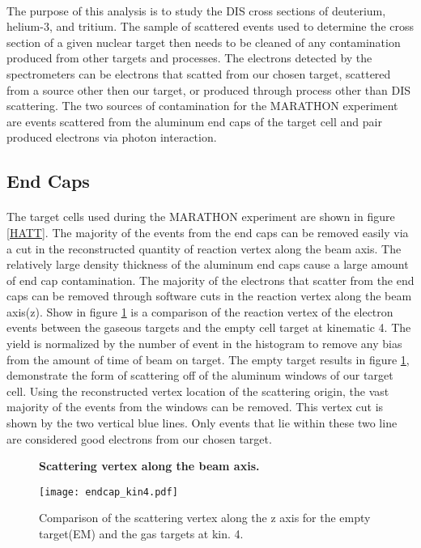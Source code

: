\paragraph{} The purpose of this analysis is to study the DIS cross sections of deuterium, helium-3, and tritium. The sample of scattered events used to determine the cross section of a given nuclear target then needs to be cleaned of any contamination produced from other targets and processes. The electrons detected by the spectrometers can be electrons that scatted from our chosen target, scattered from a source other then our target, or produced through process other than DIS scattering. The two sources of contamination for the MARATHON experiment are events scattered from the aluminum end caps of the target cell and pair produced electrons via photon interaction. 
\subsection{End Caps}
\paragraph{} The target cells used during the MARATHON experiment are shown in figure \ref{HATT}. The majority of the events from the end caps can be removed easily via a cut in the reconstructed quantity of reaction vertex along the beam axis. The relatively large density thickness of the aluminum end caps cause a large amount of end cap contamination. The majority of the electrons that scatter from the end caps can be removed through software cuts in the reaction vertex along the beam axis(z). Show in figure \ref{EC5} is a comparison of the reaction vertex of the electron events between the gaseous targets and the empty cell target at kinematic 4. The yield is normalized by the number of event in the histogram to remove any bias from the amount of time of beam on target. The empty target  results in figure \ref{EC5}, demonstrate the form of scattering off of the aluminum windows of our target cell. Using the reconstructed vertex location of the scattering origin, the vast majority of the events from the windows can be removed. This vertex cut is shown by the two vertical blue lines. Only events that lie within these two line are considered good electrons from our chosen target. 


\begin{figure}[]
	\centering
	\textbf{Scattering vertex along the beam axis. }\par\medskip
	\texttt{[image: endcap\_kin4.pdf]}
	\caption{Comparison of the scattering vertex along the z axis for the empty target(EM) and the gas targets at kin. 4. }
	\label{EC5}
\end{figure}


